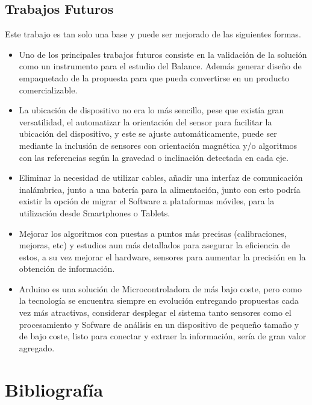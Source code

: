 \documentclass[12pt,a4paper]{article}
\begin{document}
\newpage
\subsection{Trabajos Futuros}
Este trabajo es tan solo una base y puede ser mejorado de las siguientes formas.

\begin{itemize}
	\item Uno de los principales trabajos futuros consiste en la validación de la solución como un instrumento para el estudio del Balance. Además generar diseño de empaquetado de la propuesta para que pueda convertirse en un producto comercializable.
	
	\item La ubicación de dispositivo no era lo más sencillo, pese que existía gran versatilidad, el automatizar la orientación del sensor para facilitar la ubicación del dispositivo, y este se ajuste automáticamente, puede ser mediante la inclusión de sensores con orientación magnética y/o algoritmos con las referencias según la gravedad o inclinación detectada en cada eje.
	
	\item Eliminar la necesidad de utilizar cables, añadir una interfaz de comunicación inalámbrica, junto a una batería para la alimentación, junto con esto podría existir la opción de migrar el Software a plataformas móviles, para la utilización desde Smartphones o Tablets.
	
	\item Mejorar los algoritmos con puestas a puntos más precisas (calibraciones, mejoras, etc) y estudios aun más detallados para asegurar la eficiencia de estos, a su vez mejorar el hardware, sensores para aumentar la precisión en la obtención de información.
	
	\item Arduino es una solución de Microcontroladora de más bajo coste, pero como la tecnología se encuentra siempre en evolución entregando propuestas cada vez más atractivas, considerar desplegar el sistema tanto sensores como el procesamiento y Sofware de análisis en un dispositivo de pequeño tamaño y de bajo coste, listo para conectar y extraer la información, sería de gran valor agregado.
	
\end{itemize}

\section{Bibliografía}
\printbibliography[heading=none]
\end{document}

